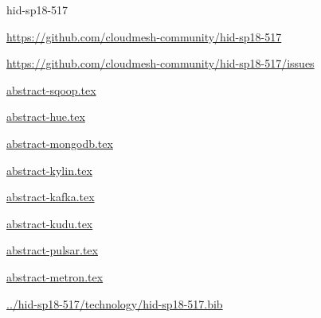 \begin{IU}

hid-sp18-517

\url{https://github.com/cloudmesh-community/hid-sp18-517}

\url{https://github.com/cloudmesh-community/hid-sp18-517/issues}

\href{https://github.com/cloudmesh-community/hid-sp18-517/blob/master//technology/abstract-sqoop.tex}{abstract-sqoop.tex}

\href{https://github.com/cloudmesh-community/hid-sp18-517/blob/master//technology/abstract-hue.tex}{abstract-hue.tex}

\href{https://github.com/cloudmesh-community/hid-sp18-517/blob/master//technology/abstract-mongodb.tex}{abstract-mongodb.tex}

\href{https://github.com/cloudmesh-community/hid-sp18-517/blob/master//technology/abstract-kylin.tex}{abstract-kylin.tex}

\href{https://github.com/cloudmesh-community/hid-sp18-517/blob/master//technology/abstract-kafka.tex}{abstract-kafka.tex}

\href{https://github.com/cloudmesh-community/hid-sp18-517/blob/master//technology/abstract-kudu.tex}{abstract-kudu.tex}

\href{https://github.com/cloudmesh-community/hid-sp18-517/blob/master//technology/abstract-pulsar.tex}{abstract-pulsar.tex}

\href{https://github.com/cloudmesh-community/hid-sp18-517/blob/master//technology/abstract-metron.tex}{abstract-metron.tex}

\href{https://github.com/cloudmesh-community/hid-sp18-517/blob/master//technology/hid-sp18-517.bib}{../hid-sp18-517/technology/hid-sp18-517.bib}

\end{IU}


